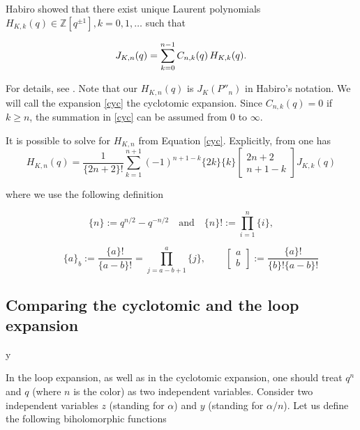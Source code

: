 \documentclass{amsart}
\theoremstyle{definition}
\def\printname#1{
    \if\draft y
        \smash{\makebox[0pt]{\hspace{-0.5in}
            \raisebox{8pt}{\tt\tiny #1}}}
    \fi
}
\newcommand{\qbinom}[2]{\text{$\left[\begin{array}{c}#1\\ #2\end{array}
\right]$}}
\def\lbl#1{\label{#1}\printname{#1}}
\def\BZ{\mathbb Z}
\def\BQ{\mathbb Q}
\def\a{\alpha}
\begin{document}
Habiro  showed that there exist unique Laurent polynomials $H_{K,k}(q) \in \BZ[q^{\pm 1}], k=0,1,\dots $ such that


\begin{equation}
\lbl{cyc}
J_{K,n}(q) = \sum_{k=0}^{n-1} C_{n,k}(q)\, H_{K,k}(q).
\end{equation}

For details, see \cite[Section 6]{H1}. Note that our $H_{K,n}(q)$ is  $J_K(P''_n)$ in  Habiro's notation.
We will call the expansion
\eqref{cyc} the cyclotomic expansion. Since $C_{n,k}(q)=0$ if $k
\ge n$, the summation in \eqref{cyc} can be assumed from $0$
to $\infty$.


It is possible to solve for $H_{K,n}$ from Equation \eqref{cyc}. Explicitly, from \cite[Lemma 6.1]{H1} one has
\begin{equation}
  H_{K,n}(q)=\frac{1}{\{2n+2\}!}\sum_{k=1}^{n+1} (-1)^{n+1-k}
  \{2k\}\{k\}
\qbinom{2n+2}{n+1-k} J_{K,k}(q) \label{33}
\end{equation}

where we use the following definition

$$ \{n\} := q^{n/2} -q^{-n/2} \quad \text{and} \quad \{n\}! :=
\prod_{i=1}^n \{i\},$$



\begin{equation*}
 \qquad \{a\}_b :=
\frac{\{a\}!}{\{a-b\}!}=\prod_{j=a-b+1}^a\{ j \}, \qquad
\qbinom{a}{b} := \frac{\{ a \}!}{\{ b \}! \{ a-b \}!}
\end{equation*}



\subsection{Comparing the cyclotomic and the loop expansion}
\lbl{sub.comparing}

In the loop expansion, as well as in the
cyclotomic expansion, one should treat $q^n$ and $q$ (where $n$ is
the color) as two independent variables. Consider two
independent variables $z$ (standing for $\a$) and $y$ (standing for
$\a/n$). Let us define the following biholomorphic functions
\end{document}
